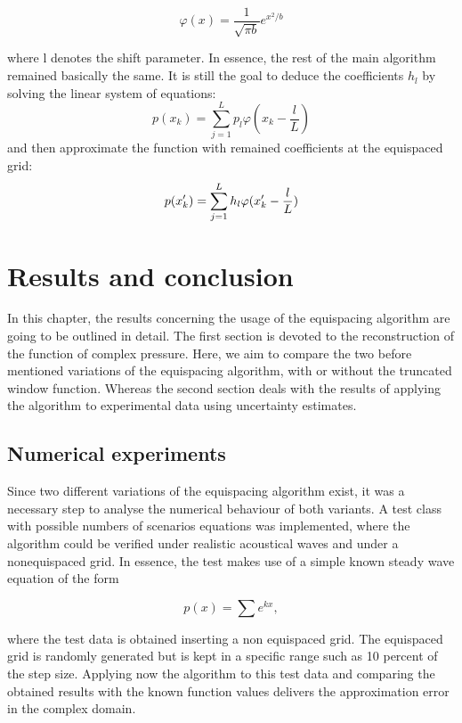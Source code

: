 \documentclass[11pt]{report} %
\begin{document}
\begin{equation}
\varphi(x)= \frac{1}{\sqrt{\pi b}}  e^{x^2/b}
\end{equation}

where l denotes the shift parameter.
In essence, the rest of the main algorithm remained basically the same.
It is still the goal to deduce the coefficients $h_{l}$ by solving the linear system of equations: 
\begin{equation}
p(x_{k})=\sum\limits_{j=1}^L p_{l}\varphi(x_{k}-\frac{l}{L})
\end{equation}
and then approximate the function with remained coefficients at the equispaced grid: 
\begin{equation}
p(x'_{k})= \sum\limits_{j=1}^L h_{l}\varphi(x'_{k}-\frac{l}{L}) \notag
\end{equation}


\chapter{Results and conclusion}
\label{chap:ResultsConclusion}
In this chapter, the results concerning the usage of the equispacing algorithm are going to be outlined in detail. 
The first section is devoted to the reconstruction of the function of complex pressure.
Here, we aim to compare the two before mentioned variations of the equispacing algorithm, with or without the truncated window function. 
Whereas the second section deals with the results of applying the algorithm to experimental data using uncertainty estimates. 
 
\section{Numerical experiments}
Since two different variations of the equispacing algorithm exist, it was a necessary step to analyse the numerical behaviour of both variants.
A test class with possible numbers of scenarios equations was implemented, where the  
algorithm could be verified under realistic acoustical waves and under a nonequispaced grid.
In essence, the test makes use of a simple known steady wave equation of the form

\begin{equation}
p(x)= \sum e^{kx},
\end{equation}

where the test data is obtained inserting a non equispaced grid. 
The equispaced grid is randomly generated but is kept in a specific range such as 10 percent of the step size. 
Applying now the algorithm to this test data and comparing the obtained results with the known function values delivers the approximation error in the complex domain.
\end{document}
